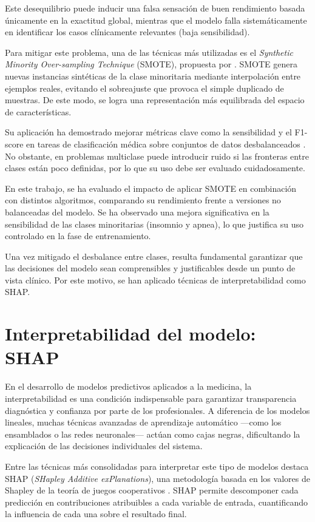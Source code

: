 Este desequilibrio puede inducir una falsa sensación de buen rendimiento basada únicamente en la exactitud global, mientras que el modelo falla sistemáticamente en identificar los casos clínicamente relevantes (baja sensibilidad).

Para mitigar este problema, una de las técnicas más utilizadas es el \textit{Synthetic Minority Over-sampling Technique} (SMOTE), propuesta por \cite{chawla2002smote}. SMOTE genera nuevas instancias sintéticas de la clase minoritaria mediante interpolación entre ejemplos reales, evitando el sobreajuste que provoca el simple duplicado de muestras. De este modo, se logra una representación más equilibrada del espacio de características.

Su aplicación ha demostrado mejorar métricas clave como la sensibilidad y el F1-score en tareas de clasificación médica sobre conjuntos de datos desbalanceados \cite{fernandez2018smote}. No obstante, en problemas multiclase puede introducir ruido si las fronteras entre clases están poco definidas, por lo que su uso debe ser evaluado cuidadosamente.

En este trabajo, se ha evaluado el impacto de aplicar SMOTE en combinación con distintos algoritmos, comparando su rendimiento frente a versiones no balanceadas del modelo. Se ha observado una mejora significativa en la sensibilidad de las clases minoritarias (insomnio y apnea), lo que justifica su uso controlado en la fase de entrenamiento.

Una vez mitigado el desbalance entre clases, resulta fundamental garantizar que las decisiones del modelo sean comprensibles y justificables desde un punto de vista clínico. Por este motivo, se han aplicado técnicas de interpretabilidad como SHAP.

\section{Interpretabilidad del modelo: SHAP}

En el desarrollo de modelos predictivos aplicados a la medicina, la interpretabilidad es una condición indispensable para garantizar transparencia diagnóstica y confianza por parte de los profesionales. A diferencia de los modelos lineales, muchas técnicas avanzadas de aprendizaje automático —como los ensamblados o las redes neuronales— actúan como cajas negras, dificultando la explicación de las decisiones individuales del sistema.

Entre las técnicas más consolidadas para interpretar este tipo de modelos destaca SHAP (\textit{SHapley Additive exPlanations}), una metodología basada en los valores de Shapley de la teoría de juegos cooperativos \cite{shap}. SHAP permite descomponer cada predicción en contribuciones atribuibles a cada variable de entrada, cuantificando la influencia de cada una sobre el resultado final.

